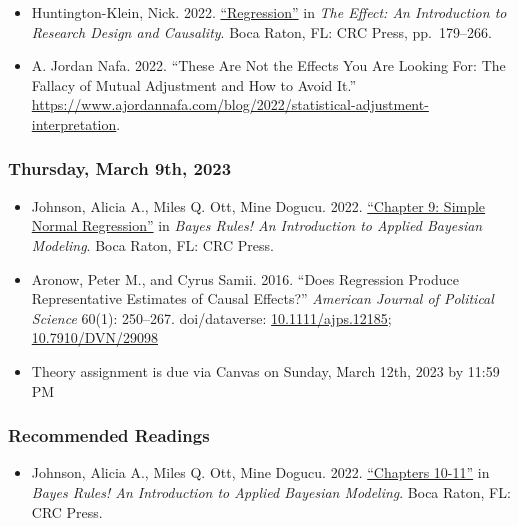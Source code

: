 \documentclass[12pt,]{article}
\providecommand{\tightlist}{%
  \setlength{\itemsep}{0pt}\setlength{\parskip}{0pt}}
\begin{document}
\begin{itemize}
\item
  Huntington-Klein, Nick. 2022.
  \href{https://theeffectbook.net/ch-StatisticalAdjustment.html}{``Regression''}
  in \emph{The Effect: An Introduction to Research Design and
  Causality}. Boca Raton, FL: CRC Press, pp.~179--266.
\item
  A. Jordan Nafa. 2022. ``These Are Not the Effects You Are Looking For:
  The Fallacy of Mutual Adjustment and How to Avoid It.''
  \url{https://www.ajordannafa.com/blog/2022/statistical-adjustment-interpretation}.
\end{itemize}

\hypertarget{thursday-march-9th-2023}{%
\subsubsection{Thursday, March 9th,
2023}\label{thursday-march-9th-2023}}

\begin{itemize}
\item
  Johnson, Alicia A., Miles Q. Ott, Mine Dogucu. 2022.
  \href{https://www.bayesrulesbook.com/chapter-9.html}{``Chapter 9:
  Simple Normal Regression''} in \emph{Bayes Rules! An Introduction to
  Applied Bayesian Modeling}. Boca Raton, FL: CRC Press.
\item
  Aronow, Peter M., and Cyrus Samii. 2016. ``Does Regression Produce
  Representative Estimates of Causal Effects?'' \emph{American Journal
  of Political Science} 60(1): 250--267. doi/dataverse:
  \href{https://doi.org/10.1111/ajps.12185}{10.1111/ajps.12185};
  \href{https://dataverse.harvard.edu/dataset.xhtml?persistentId=doi:10.7910/DVN/29098}{10.7910/DVN/29098}
\item
  Theory assignment is due via Canvas on Sunday, March 12th, 2023 by
  11:59 PM
\end{itemize}

\hypertarget{recommended-readings-5}{%
\subsubsection{Recommended Readings}\label{recommended-readings-5}}

\begin{itemize}
\tightlist
\item
  Johnson, Alicia A., Miles Q. Ott, Mine Dogucu. 2022.
  \href{https://www.bayesrulesbook.com/chapter-10.html}{``Chapters
  10-11''} in \emph{Bayes Rules! An Introduction to Applied Bayesian
  Modeling}. Boca Raton, FL: CRC Press.
\end{itemize}
\end{document}
